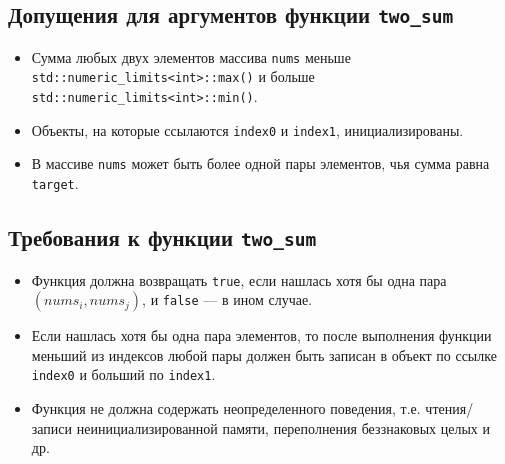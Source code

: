 \documentclass[14pt]{extarticle}
\begin{document}
    \subsection{Допущения для аргументов функции \texttt{two\_sum}}

        \begin{itemize}

            \item Сумма любых двух элементов массива \verb|nums| меньше \\
                \verb|std::numeric_limits<int>::max()|\footnotemark{}
                и больше \\ \verb|std::numeric_limits<int>::min()|.

            \item Объекты, на которые ссылаются \verb|index0| и \verb|index1|,
                инициализированы.

            \item В массиве \verb|nums| может быть более одной пары элементов,
                чья сумма равна \verb|target|.

        \end{itemize}


    \subsection{Требования к функции \texttt{two\_sum}} \label{requirements}

        \begin{itemize}

            \item Функция должна возвращать \verb|true|, если нашлась хотя бы одна
                пара $(nums_i, nums_j)$, и \verb|false| --- в ином случае.

            \item Если нашлась хотя бы одна пара элементов, то после выполнения
                функции меньший из индексов любой пары должен быть записан в объект
                по ссылке \verb|index0| и больший по \verb|index1|.

            \item Функция не должна содержать неопределенного поведения, т.е.
                чтения/записи неинициализированной памяти, переполнения беззнаковых
                целых и др.

        \end{itemize}
\end{document}
